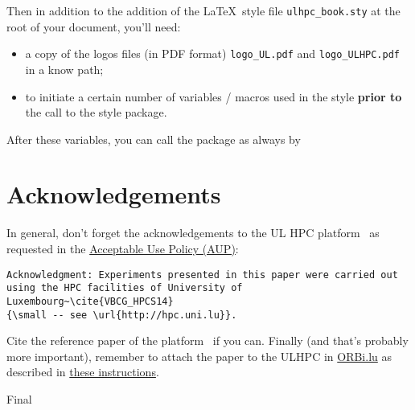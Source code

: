 \documentclass[a4paper,11pt,twoside,a4paper]{book}
\def\reportversion{Final}  %
\begin{document}
Then in addition to the addition of the \LaTeX\ style file \texttt{ulhpc\_book.sty} at the root of your document, you'll need: 

\begin{itemize}
  \item a copy of the logos files (in PDF format) \texttt{logo\_UL.pdf} and \texttt{logo\_ULHPC.pdf} in a know path;
  \item to initiate a certain number of variables / macros used in the style \textbf{prior to} the call to the style package.
\end{itemize}



After these variables, you can call the package as always by 



\chapter{Acknowledgements}

In general, don't forget the  acknowledgements to the UL HPC platform~\cite{VBCG_HPCS14} as requested in the \href{https://hpc.uni.lu/users/AUP.html}{Acceptable Use Policy (AUP)}: 

\begin{verbatim}
Acknowledgment: Experiments presented in this paper were carried out 
using the HPC facilities of University of Luxembourg~\cite{VBCG_HPCS14} 
{\small -- see \url{http://hpc.uni.lu}}.
\end{verbatim}

Cite the reference paper of the platform~\cite{VBCG_HPCS14} if you can. Finally (and that's probably more important), remember to attach the paper to the ULHPC in \href{http://publications.uni.lu/}{ORBi.lu} as described in \href{https://hpc.uni.lu/about/publis.html#acknowledgement-banner-and-orbilu-instructions}{these instructions}.


% 
% 


\newpage
{}


\newpage
\appendix
% 




\backmatter
\ifx\reportversion\printversion
  \makebackpage                  %
\fi
\end{document}
